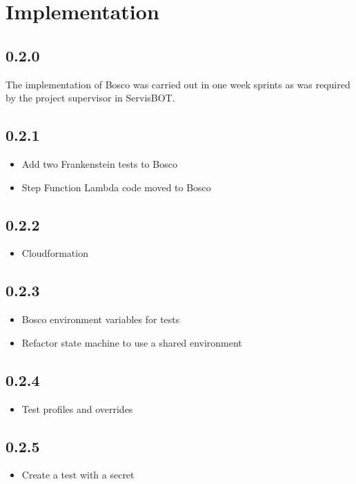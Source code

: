 \documentclass[12pt,a4paper,titlepage]{report}
\begin{document}
\section{Implementation}\subsection*{0.2.0}
The implementation of Bosco was carried out in one week sprints as was required by the project supervisor in ServisBOT. 
\subsection*{0.2.1}
\begin{itemize}
\item Add two Frankenstein tests to Bosco
\item Step Function Lambda code moved to Bosco
\end{itemize}

\subsection*{0.2.2}
\begin{itemize}
\item Cloudformation
\end{itemize}

\subsection*{0.2.3}
\begin{itemize}
\item Bosco environment variables for tests
\item Refactor state machine to use a shared environment
\end{itemize}

\subsection*{0.2.4}
\begin{itemize}
\item Test profiles and overrides
\end{itemize}

\subsection*{0.2.5}
\begin{itemize}
\item Create a test with a secret
\end{itemize}
\end{document}
